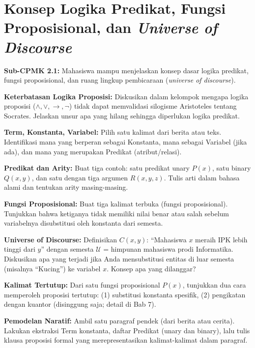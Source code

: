 \documentclass[../main]{subfiles}
\begin{document}
\chapter{Konsep Logika Predikat, Fungsi Proposisional, dan \textit{Universe of Discourse}}

\begin{subcpmk}
  \item \textbf{Sub-CPMK 2.1:} Mahasiswa mampu menjelaskan konsep dasar logika predikat, fungsi proposisional, dan ruang lingkup pembicaraan (\textit{universe of discourse}).
\end{subcpmk}










\begin{aktivitas}
  \item \textbf{Keterbatasan Logika Proposisi:} Diskusikan dalam kelompok mengapa logika proposisi ($\wedge, \vee, \rightarrow, \neg$) tidak dapat memvalidasi silogisme Aristoteles tentang Socrates. Jelaskan unsur apa yang hilang sehingga diperlukan logika predikat.
  \item \textbf{Term, Konstanta, Variabel:} Pilih satu kalimat dari berita atau teks. Identifikasi mana yang berperan sebagai Konstanta, mana sebagai Variabel (jika ada), dan mana yang merupakan Predikat (atribut/relasi).
  \item \textbf{Predikat dan Arity:} Buat tiga contoh: satu predikat unary $P(x)$, satu binary $Q(x,y)$, dan satu dengan tiga argumen $R(x,y,z)$. Tulis arti dalam bahasa alami dan tentukan arity masing-masing.
  \item \textbf{Fungsi Proposisional:} Buat tiga kalimat terbuka (fungsi proposisional). Tunjukkan bahwa ketiganya tidak memiliki nilai benar atau salah sebelum variabelnya disubstitusi oleh konstanta dari semesta.
  \item \textbf{Universe of Discourse:} Definisikan $C(x,y)$: ``Mahasiswa $x$ meraih IPK lebih tinggi dari $y$'' dengan semesta $\mathcal{U}$ = himpunan mahasiswa prodi Informatika. Diskusikan apa yang terjadi jika Anda mensubstitusi entitas di luar semesta (misalnya ``Kucing'') ke variabel $x$. Konsep apa yang dilanggar?
  \item \textbf{Kalimat Tertutup:} Dari satu fungsi proposisional $P(x)$, tunjukkan dua cara memperoleh proposisi tertutup: (1) substitusi konstanta spesifik, (2) pengikatan dengan kuantor (disinggung saja; detail di Bab 7).
  \item \textbf{Pemodelan Naratif:} Ambil satu paragraf pendek (dari berita atau cerita). Lakukan ekstraksi Term konstanta, daftar Predikat (unary dan binary), lalu tulis klausa proposisi formal yang merepresentasikan kalimat-kalimat dalam paragraf.
\end{aktivitas}
\end{document}
